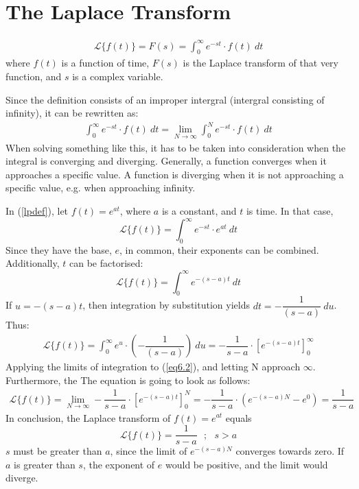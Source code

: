 \section{The Laplace Transform}
\begin{tcolorbox}[colback=blue!5!white,colframe=blue!75!black,title=Definition]
\begin{align}
\mathcal{L}\{f(t)\}=F(s)=\int_{0}^{\infty} e^{-st}\cdot f(t)\ dt
\label{lpdef}
\end{align}
where $f(t)$ is a function of time, $F(s)$ is the Laplace transform of that very function, and $s$ is a complex variable.
\end{tcolorbox}
Since the definition consists of an improper intergral (intergral consisting of infinity), it can be rewritten as:
\begin{align}
\int_{0}^{\infty} e^{-st}\cdot f(t)\ dt = \lim_{N \to \infty} \int_{0}^{N} e^{-st}\cdot f(t)\ dt
\end{align}
When solving something like this, it has to be taken into consideration when the integral is converging and diverging. Generally, a function converges when it approaches a specific value. A function is diverging when it is not approaching a specific value, e.g. when approaching infinity.  
\begin{tcolorbox}[colback=red!5!white,colframe=red!55!black,title=Example of a Laplace transform]
In (\ref{lpdef}), let $f(t)=e^{at}$, where $a$ is a constant, and $t$ is time. In that case,
$$\mathcal{L}\{f(t)\}=\int_{0}^{\infty} e^{-st}\cdot e^{at}\ dt$$
Since they have the base, $e$, in common, their exponents can be combined. Additionally, $t$ can be factorised:
$$\mathcal{L}\{f(t)\}=\int_{0}^{\infty} e^{-(s-a)t}\ dt$$
If $u=-(s-a)t$, then integration by substitution yields $dt=-\dfrac{1}{(s-a)}\ du$. Thus:
\begin{align}
\mathcal{L}\{f(t)\}=\int_{0}^{\infty} e^{u}\cdot (-\dfrac{1}{(s-a)})\ du =  -\dfrac{1}{s-a} \cdot \left[e^{-(s-a)t} \right]_{0}^{\infty}
\label{eq6.2}
\end{align}
Applying the limits of integration to (\ref{eq6.2}), and letting N approach $\infty$. Furthermore, the The equation is going to look as follows:
\begin{align*}
\mathcal{L}\{f(t)\} = \lim_{N \to \infty} -\dfrac{1}{s-a} \cdot \left[e^{-(s-a)t} \right]_{0}^{N} =-\dfrac{1}{s-a}\cdot (e^{-(s-a)N}-e^{0})=\dfrac{1}{s-a}
\end{align*}
In conclusion, the Laplace transform of $f(t)=e^{at}$ equals
$$\mathcal{L}\{f(t)\}=\dfrac{1}{s-a} \ \ \ ;\ \ \ s>a$$
$s$ must be greater than $a$, since the limit of $e^{-(s-a)N}$ converges towards zero. If $a$ is greater than $s$, the exponent of $e$ would be positive, and the limit would diverge.
\end{tcolorbox}

